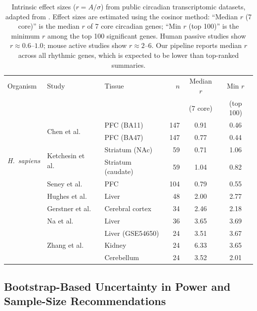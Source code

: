 \documentclass{article}
\begin{document}
\begin{table}[H]
\centering
\small
\begin{tabular}{ll|lrcc}
\toprule
Organism & Study & Tissue & $n$ & \multicolumn{1}{c}{Median $r$} & \multicolumn{1}{c}{Min $r$} \\
 & & & & \multicolumn{1}{c}{(7 core)} & \multicolumn{1}{c}{(top 100)} \\
\midrule
\multirow{6}{*}{\textit{H.\ sapiens}} & \multirow{2}{*}{Chen et al.\ \cite{chen2016aging}} & PFC (BA11) & 147 & 0.91 & 0.46 \\
 & & PFC (BA47) & 147 & 0.77 & 0.44 \\
 & \multirow{2}{*}{Ketchesin et al.\ \cite{ketchesin2021diurnal}} & Striatum (NAc) & 59 & 0.71 & 1.06 \\
 & & Striatum (caudate) & 59 & 1.04 & 0.82 \\
 & Seney et al.\ \cite{seney2019diurnal} & PFC & 104 & 0.79 & 0.55 \\

\midrule
\multirow{6}{*}{\textit{M.\ musculus}} & Hughes et al.\ \cite{hughes2009harmonics} & Liver & 48 & 2.00 & 2.77 \\
 & Gerstner et al.\ \cite{gerstner2016removal} & Cerebral cortex & 34 & 2.46 & 2.18 \\
 & Na et al.\ \cite{na2009comprehensive} & Liver & 36 & 3.65 & 3.69 \\
 & \multirow{3}{*}{Zhang et al.\ \cite{zhang2014comprehensive}} & Liver (GSE54650) & 24 & 3.51 & 3.67 \\
 & & Kidney & 24 & 6.33 & 3.65 \\
 & & Cerebellum & 24 & 3.52 & 2.01 \\
\bottomrule
\end{tabular}
\caption{Intrinsic effect sizes ($r = A/\sigma$) from public circadian transcriptomic datasets, adapted from \cite{zong2023circapower}. Effect sizes are estimated using the cosinor method: ``Median $r$ (7 core)'' is the median $r$ of 7 core circadian genes; ``Min $r$ (top 100)'' is the minimum $r$ among the top 100 significant genes. Human passive studies show $r \approx 0.6$--$1.0$; mouse active studies show $r \approx 2$--$6$. Our pipeline reports median $r$ across all rhythmic genes, which is expected to be lower than top-ranked summaries.}
\label{tab:effect_sizes}
\end{table}

\subsection{Bootstrap-Based Uncertainty in Power and Sample-Size Recommendations}
\end{document}
